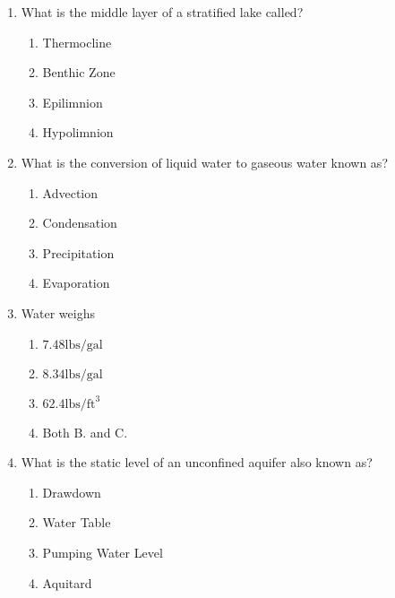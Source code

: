 \begin{enumerate}
\item What is the middle layer of a stratified lake called?\\
\begin{enumerate}
\item Thermocline\\
\item Benthic Zone\\
\item Epilimnion\\
\item Hypolimnion
\end{enumerate}

\item  What is the conversion of liquid water to gaseous water known as?\\
\begin{enumerate}
\item Advection\\
\item Condensation\\
\item Precipitation\\
\item Evaporation
\end{enumerate}

\item  Water weighs\\
\begin{enumerate}
\item $7.48 \mathrm{lbs} / \mathrm{gal}$\\
\item $8.34 \mathrm{lbs} / \mathrm{gal}$\\
\item $62.4 \mathrm{lbs} / \mathrm{ft}^{3}$\\
\item Both B. and C.
\end{enumerate}

\item  What is the static level of an unconfined aquifer also known as?\\
\begin{enumerate}
\item Drawdown\\
\item Water Table\\
\item Pumping Water Level\\
\item Aquitard
\end{enumerate}


\end{enumerate}
